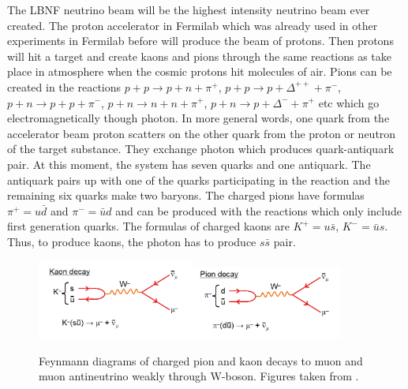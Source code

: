 The LBNF neutrino beam will be the highest intensity neutrino beam ever created. The proton accelerator in Fermilab which was already used in other experiments in Fermilab before will produce the beam of protons. Then protons will hit a target and create kaons and pions through the same reactions as take place in atmosphere when the cosmic protons hit molecules of air.  Pions can be created in the reactions $p+p \rightarrow p+n+\pi^+$, $p+p \rightarrow p+\Delta^{++}+\pi^-$, $p+n \rightarrow p+p+\pi^-$, $p+n \rightarrow n+n+\pi^+$, $p+n \rightarrow p+\Delta^{-}+\pi^+$ etc which go electromagnetically though photon. In more general words, one quark from the accelerator beam proton scatters on the other quark from the proton or neutron of the target substance. They exchange photon which produces quark-antiquark pair. At this moment, the system has seven quarks and one antiquark. The antiquark pairs up with one of the quarks participating in the reaction and the remaining six quarks make two baryons.  The charged pions have formulas $\pi^+ = u\bar{d}$ and $\pi^- = \bar{u}d$ and can be produced with the reactions which only include first generation quarks. The formulas of charged kaons are $K^+ = u\bar{s}$, $K^- = \bar{u}s$. Thus, to produce kaons, the photon has to produce $s\bar{s}$ pair. 

\begin{figure}
\caption{Feynmann diagrams of charged pion and kaon decays to muon and muon antineutrino weakly through W-boson. Figures taken from \cite{ref_fig_pionandKaonDecays}.}
\label{fig:pionAndKaonDecays}
\centering
\includegraphics[width=0.45\textwidth, keepaspectratio=true]{figs/kaonDecay.jpg}\includegraphics[width=0.45\textwidth, keepaspectratio=true]{figs/pionDecay.jpg} 
\end{figure}

